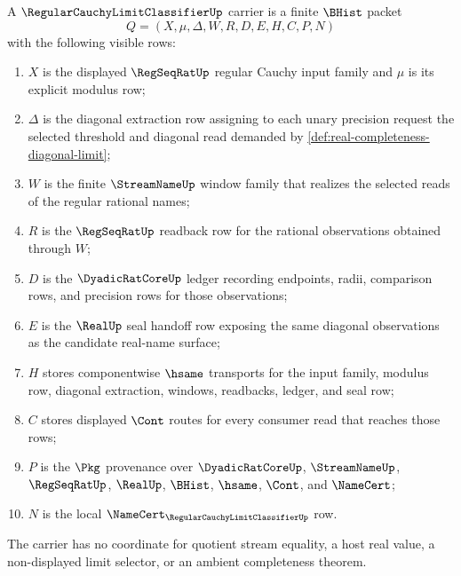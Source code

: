 \begin{definition}
\label{def:regular-cauchy-limit-classifier-carrier}
A $\RegularCauchyLimitClassifierUp$ carrier is a finite $\BHist$ packet
$$
Q=(X,\mu,\Delta,W,R,D,E,H,C,P,N)
$$
with the following visible rows:
\begin{enumerate}
\item $X$ is the displayed $\RegSeqRatUp$ regular Cauchy input family and $\mu$ is its explicit modulus row;
\item $\Delta$ is the diagonal extraction row assigning to each unary precision request the selected threshold and diagonal read demanded by \autoref{def:real-completeness-diagonal-limit};
\item $W$ is the finite $\StreamNameUp$ window family that realizes the selected reads of the regular rational names;
\item $R$ is the $\RegSeqRatUp$ readback row for the rational observations obtained through $W$;
\item $D$ is the $\DyadicRatCoreUp$ ledger recording endpoints, radii, comparison rows, and precision rows for those observations;
\item $E$ is the $\RealUp$ seal handoff row exposing the same diagonal observations as the candidate real-name surface;
\item $H$ stores componentwise $\hsame$ transports for the input family, modulus row, diagonal extraction, windows, readbacks, ledger, and seal row;
\item $C$ stores displayed $\Cont$ routes for every consumer read that reaches those rows;
\item $P$ is the $\Pkg$ provenance over $\DyadicRatCoreUp$, $\StreamNameUp$, $\RegSeqRatUp$, $\RealUp$, $\BHist$, $\hsame$, $\Cont$, and $\NameCert$;
\item $N$ is the local $\NameCert_{\RegularCauchyLimitClassifierUp}$ row.
\end{enumerate}
The carrier has no coordinate for quotient stream equality, a host real value, a non-displayed limit selector, or an ambient completeness theorem.
\end{definition}


